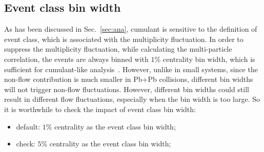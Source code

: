 \subsection{Event class bin width}
As has been discussed in Sec.~\ref{sec:ana}, cumulant is sensitive to the definition of event class, which is associated with the multiplicity fluctuation. In order to suppress the multiplicity fluctuation, while calculating the multi-particle correlation, the events are always binned with $1\%$ centrality bin width, which is sufficient for cumulant-like analysis~\cite{Jia:2017hbm}. However, unlike in small systems, since the non-flow contribution is much smaller in Pb+Pb collisions, different bin widths will not trigger non-flow fluctuations. However, different bin widths could still result in different flow fluctuations, especially when the bin width is too large. So it is worthwhile to check the impact of event class bin width:
\begin{itemize}
\item default: $1\%$ centrality as the event class bin width;
\item check: $5\%$ centrality as the event class bin width;
\end{itemize}

